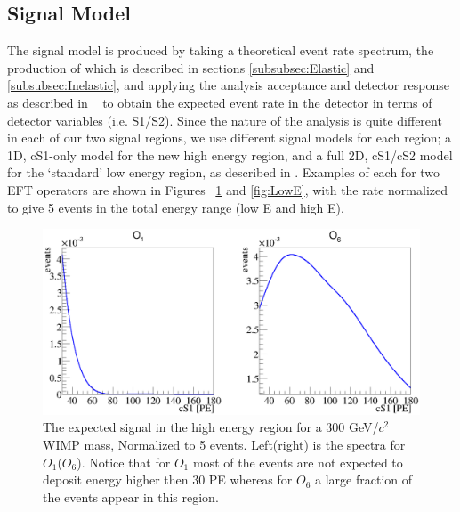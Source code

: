 \subsection{Signal Model}
\label{subsec:SignalModel}
The signal model is produced by taking a theoretical event rate spectrum, the production of which is described in sections \ref{subsubsec:Elastic} and \ref{subsubsec:Inelastic}, and applying the analysis acceptance and detector response as described in ~\cite{xe100_ana2012} to obtain the expected event rate in the detector in terms of detector variables (i.e. S1/S2). Since the nature of the analysis is quite different in each of our two signal regions, we use different signal models for each region; a 1D, cS1-only model for the new high energy region, and a full 2D, cS1/cS2 model for the `standard' low energy region, as described in \cite{xe100_run_combination}. Examples of each for two EFT operators are shown in Figures ~\ref{fig:HighE} and \ref{fig:LowE}, with the rate normalized to give 5 events in the total energy range (low E and high E).

\begin{figure}[h!]
\begin{minipage}{1.\linewidth}
\centerline{\includegraphics[width=1.\linewidth]{Figures/SigHighO1O6.eps}}
\end{minipage}
\caption{The expected signal in the high energy region for a 300 GeV/$c^2$ WIMP mass, Normalized to 5 events. Left(right) is the spectra for $O_1$($O_6$). Notice that for $O_1$ most of the events are not expected to deposit energy higher then 30 PE whereas for $O_6$ a large fraction of the events appear in this region.}
\label{fig:HighE}
\end{figure} 

